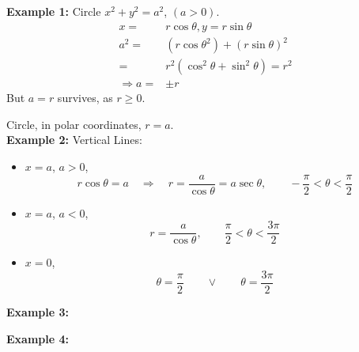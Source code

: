 \documentclass[12pt]{article}
\theoremstyle{plain}
\begin{document}
{\color{Brown}
\textbf{Example 1:} Circle
$x^2 + y^2 = a^2$, $(a>0)$. 
\begin{align*}
	x =& r\cos \theta, y = r\sin\theta\\
%
	a^2 
	=& (r\cos\theta^2) + (r\sin\theta)^2 \\
	=& r^2 (\cos^2\theta+\sin^2\theta) = r^2\\
	\Rightarrow a =& \pm r
\end{align*}
But $a = r$ survives, as $r\geq 0$. 

Circle, in polar coordinates, $r = a$. \\


\textbf{Example 2: }Vertical Lines: 

\begin{itemize}
	\item 	$x = a$, $a > 0$, 
	\[
		r\cos \theta = a 
		\quad \Rightarrow \quad 
		r = \frac a{\cos\theta} = a\sec\theta,
		\qquad -\frac{\pi}2 < \theta < \frac{\pi}2
	\]
	\item $x = a$, $a < 0$, 
		\[
			r = \frac a{\cos\theta}, \qquad \frac{\pi}2 < \theta < \frac{3\pi}2
		\]
	\item $x = 0$, 
		\[
			\theta = \frac{\pi}2 \qquad  \lor \qquad  \theta = \frac{3\pi}2
		\]
\end{itemize}

\newpage

\textbf{Example 3:}
\begin{figure}[!htbp]
	\centering
\end{figure}

\textbf{Example 4: }
\begin{figure}[!htbp]
	\centering
\end{figure}


}
\end{document}
